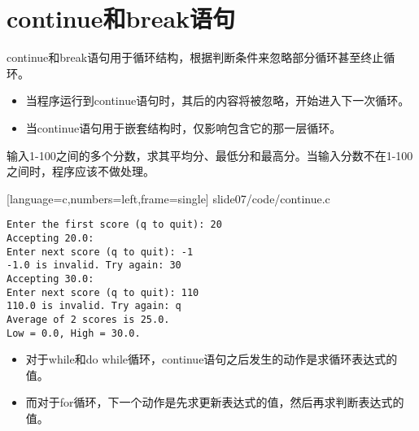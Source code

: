 \section{continue和break语句}
\begin{frame}[fragile]\ft{\secname}
continue和break语句用于循环结构，根据判断条件来忽略部分循环甚至终止循环。
\end{frame}


\begin{frame}[fragile]
\begin{itemize}
\item
当程序运行到continue语句时，其后的内容将被忽略，开始进入下一次循环。\\[0.1in]
\item
当continue语句用于嵌套结构时，仅影响包含它的那一层循环。
\end{itemize}
\end{frame}


\begin{frame}[fragile]
\begin{li}
输入1-100之间的多个分数，求其平均分、最低分和最高分。当输入分数不在1-100之间时，程序应该不做处理。
\end{li}

\end{frame}


\begin{frame}

[language=c,numbers=left,frame=single]
{slide07/code/continue.c}
\end{frame}

\begin{frame}[fragile]
\begin{lstlisting}[backgroundcolor=\color{red!10}]
Enter the first score (q to quit): 20
Accepting 20.0:
Enter next score (q to quit): -1
-1.0 is invalid. Try again: 30
Accepting 30.0:
Enter next score (q to quit): 110
110.0 is invalid. Try again: q
Average of 2 scores is 25.0.
Low = 0.0, High = 30.0.
\end{lstlisting}

\end{frame}

\begin{frame}[fragile]
\begin{itemize}
\item 对于while和do while循环，continue语句之后发生的动作是求循环表达式的值。\\[0.1in]
\item 而对于for循环，下一个动作是先求更新表达式的值，然后再求判断表达式的值。
\end{itemize}

\end{frame}


